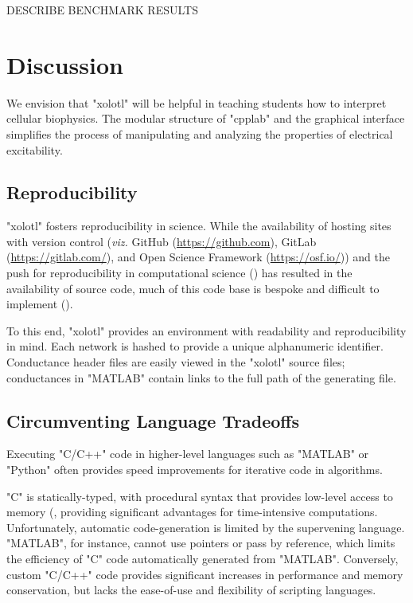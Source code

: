 \documentclass{frontiersSCNS} %
\newcommand{\viz}{\textit{viz.}\xspace}
\begin{document}
DESCRIBE BENCHMARK RESULTS

%
%
%
%
%
%

\section{Discussion}
\label{discussion}

We envision that "xolotl" will be helpful in teaching students how to interpret cellular biophysics. The modular structure of "cpplab" and the graphical interface simplifies the process of manipulating and analyzing the properties of electrical excitability.

\subsection{Reproducibility}

"xolotl" fosters reproducibility in science. While the availability of hosting sites with version control (\viz GitHub (\url{https://github.com}), GitLab (\url{https://gitlab.com/}), and Open Science Framework (\url{https://osf.io/})) and the push for reproducibility in computational science (\cite{eklundClusterFailureWhy2016, stoddenEnhancingReproducibilityComputational2016, bakerWhyScientistsMust2016}) has resulted in the availability of source code, much of this code base is bespoke and difficult to implement (\cite{sedanoCodeReadabilityTesting2016, xuMeasurementSourceCode2017}).

To this end, "xolotl" provides an environment with readability and reproducibility in mind. Each network is hashed to provide a unique alphanumeric identifier. Conductance header files are easily viewed in the "xolotl" source files; conductances in "MATLAB" contain links to the full path of the generating file.

\subsection{Circumventing Language Tradeoffs}

Executing "C/C++" code in higher-level languages such as "MATLAB" or "Python" often provides speed improvements for iterative code in algorithms. 

"C" is statically-typed, with procedural syntax that provides low-level access to memory (\cite{kernighanProgrammingLanguage1978}, providing significant advantages for time-intensive computations. Unfortunately, automatic code-generation is limited by the supervening language. "MATLAB", for instance, cannot use pointers or pass by reference, which limits the efficiency of "C" code automatically generated from "MATLAB". Conversely, custom "C/C++" code provides significant increases in performance and memory conservation, but lacks the ease-of-use and flexibility of scripting languages.
\end{document}
